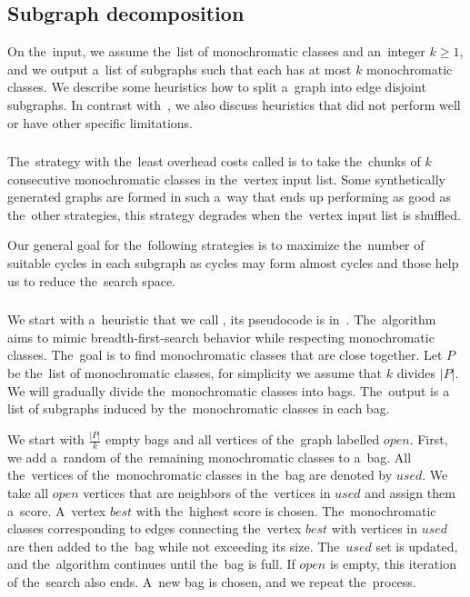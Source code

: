 \subsection{Subgraph decomposition}%
\label{sec:decomposition}

On the~input, we assume the~list of monochromatic classes
and an~integer $k\geq 1$, and we output a~list of subgraphs
such that each has at most $k$ monochromatic classes.
We describe some heuristics how to split a~graph into edge disjoint subgraphs.
In contrast with~\cite{my_paper}, we also discuss heuristics
that did not perform well or have other specific limitations.

\subsubsection*{\None{}}

The~strategy with the~least overhead costs called \None{}
is to take the~chunks of $k$ consecutive
monochromatic classes in the~vertex input list.
Some synthetically generated graphs are formed in such a~way
that \None{} ends up performing as good as the~other strategies,
this strategy degrades when the~vertex input list is shuffled.

Our general goal for the~following strategies
is to maximize the~number of suitable cycles in each
subgraph as cycles may form almost cycles and those help us
to reduce the~search space.

\subsubsection*{\Neighbors{}}

We start with a~heuristic that we call \Neighbors{},
its pseudocode is in~.
The~algorithm aims to mimic breadth-first-search
behavior while respecting monochromatic classes.
The~goal is to find monochromatic classes that are close together.
Let $P$ be the~list of monochromatic classes,
for simplicity we assume that $k$ divides $|P|$.
We will gradually divide the~monochromatic classes into bags.
The~output is a list of subgraphs induced by the~monochromatic classes in each bag.

We start with $\frac{|P|}{k}$ empty bags
and all vertices of the~graph labelled $open$.
First, we add a~random of the~remaining monochromatic classes to a~bag.
All the~vertices of the~monochromatic classes in the~bag are denoted by $used$.
We take all $open$ vertices that are neighbors of the~vertices in $used$ and assign
them a~score. A~vertex $best$ with the~highest score is chosen.
The~monochromatic classes corresponding to edges connecting the~vertex $best$
with vertices in $used$ are then added to the~bag while not exceeding its size.
The~$used$ set is updated, and the~algorithm continues until the~bag is full.
If $open$ is empty, this iteration of the~search also ends.
A~new bag is chosen, and we repeat the~process.

